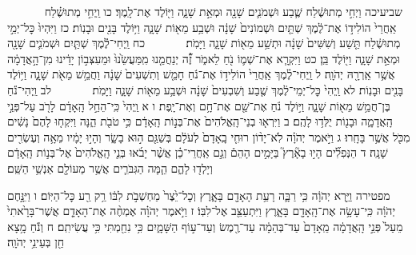 \documentclass[twoside, openany, parskip=half, 11pt]{book}
\begin{document}
　　　 שביעיכה וַיְחִ֣י מְתוּשֶׁ֔לַח שֶׁ֧בַע וּשְׁמֹנִ֛ים שָׁנָ֖ה וּמְאַ֣ת שָׁנָ֑ה וַיּ֖וֹלֶד אֶת־לָֽמֶךְ׃ כו וַֽיְחִ֣י מְתוּשֶׁ֗לַח אַֽחֲרֵי֙ הוֹלִיד֣וֹ אֶת־לֶ֔מֶךְ שְׁתַּ֤יִם וּשְׁמוֹנִים֙ שָׁנָ֔ה וּשְׁבַ֥ע מֵא֖וֹת שָׁנָ֑ה וַיּ֥וֹלֶד בָּנִ֖ים וּבָנֽוֹת׃ כז וַיִּהְיוּ֙ כׇּל־יְמֵ֣י מְתוּשֶׁ֔לַח תֵּ֤שַׁע וְשִׁשִּׁים֙ שָׁנָ֔ה וּתְשַׁ֥ע מֵא֖וֹת שָׁנָ֑ה וַיָּמֹֽת׃
　　　 כח וַֽיְחִי־לֶ֕מֶךְ שְׁתַּ֧יִם וּשְׁמֹנִ֛ים שָׁנָ֖ה וּמְאַ֣ת שָׁנָ֑ה וַיּ֖וֹלֶד בֵּֽן׃ כט וַיִּקְרָ֧א אֶת־שְׁמ֛וֹ נֹ֖חַ לֵאמֹ֑ר זֶ֞‍֠ה יְנַחֲמֵ֤נוּ מִֽמַּעֲשֵׂ֙נוּ֙ וּמֵעִצְּב֣וֹן יָדֵ֔ינוּ מִן־הָ֣אֲדָמָ֔ה אֲשֶׁ֥ר אֵֽרְרָ֖הּ יְהֹוָֽה׃ ל וַֽיְחִי־לֶ֗מֶךְ אַֽחֲרֵי֙ הוֹלִיד֣וֹ אֶת־נֹ֔חַ חָמֵ֤שׁ וְתִשְׁעִים֙ שָׁנָ֔ה וַחֲמֵ֥שׁ מֵאֹ֖ת שָׁנָ֑ה וַיּ֥וֹלֶד בָּנִ֖ים וּבָנֽוֹת׃ לא וַֽיְהִי֙ כׇּל־יְמֵי־לֶ֔מֶךְ שֶׁ֤בַע וְשִׁבְעִים֙ שָׁנָ֔ה וּשְׁבַ֥ע מֵא֖וֹת שָׁנָ֑ה וַיָּמֹֽת׃
　　　 לב וַֽיְהִי־נֹ֕חַ בֶּן־חֲמֵ֥שׁ מֵא֖וֹת שָׁנָ֑ה וַיּ֣וֹלֶד נֹ֔חַ אֶת־שֵׁ֖ם אֶת־חָ֥ם וְאֶת־יָֽפֶת׃ ו א וַֽיְהִי֙ כִּֽי־הֵחֵ֣ל הָֽאָדָ֔ם לָרֹ֖ב עַל־פְּנֵ֣י הָֽאֲדָמָ֑ה וּבָנ֖וֹת יֻלְּד֥וּ לָהֶֽם׃ ב וַיִּרְא֤וּ בְנֵי־הָֽאֱלֹהִים֙ אֶת־בְּנ֣וֹת הָֽאָדָ֔ם כִּ֥י טֹבֹ֖ת הֵ֑נָּה וַיִּקְח֤וּ לָהֶם֙ נָשִׁ֔ים מִכֹּ֖ל אֲשֶׁ֥ר בָּחָֽרוּ׃ ג וַיֹּ֣אמֶר יְהֹוָ֗ה לֹֽא־יָד֨וֹן רוּחִ֤י בָֽאָדָם֙ לְעֹלָ֔ם בְּשַׁגַּ֖ם ה֣וּא בָשָׂ֑ר וְהָי֣וּ יָמָ֔יו מֵאָ֥ה וְעֶשְׂרִ֖ים שָׁנָֽה׃ ד הַנְּפִלִ֞ים הָי֣וּ בָאָ֘רֶץ֮ בַּיָּמִ֣ים הָהֵם֒ וְגַ֣ם אַֽחֲרֵי־כֵ֗ן אֲשֶׁ֨ר יָבֹ֜אוּ בְּנֵ֤י הָֽאֱלֹהִים֙ אֶל־בְּנ֣וֹת הָֽאָדָ֔ם וְיָלְד֖וּ לָהֶ֑ם הֵ֧מָּה הַגִּבֹּרִ֛ים אֲשֶׁ֥ר מֵעוֹלָ֖ם אַנְשֵׁ֥י הַשֵּֽׁם׃

מפטירה וַיַּ֣רְא יְהֹוָ֔ה כִּ֥י רַבָּ֛ה רָעַ֥ת הָאָדָ֖ם בָּאָ֑רֶץ וְכׇל־יֵ֙צֶר֙ מַחְשְׁבֹ֣ת לִבּ֔וֹ רַ֥ק רַ֖ע כׇּל־הַיּֽוֹם׃ ו וַיִּנָּ֣חֶם יְהֹוָ֔ה כִּֽי־עָשָׂ֥ה אֶת־הָֽאָדָ֖ם בָּאָ֑רֶץ וַיִּתְעַצֵּ֖ב אֶל־לִבּֽוֹ׃ ז וַיֹּ֣אמֶר יְהֹוָ֗ה אֶמְחֶ֨ה אֶת־הָאָדָ֤ם אֲשֶׁר־בָּרָ֙אתִי֙ מֵעַל֙ פְּנֵ֣י הָֽאֲדָמָ֔ה מֵֽאָדָם֙ עַד־בְּהֵמָ֔ה עַד־רֶ֖מֶשׂ וְעַד־ע֣וֹף הַשָּׁמָ֑יִם כִּ֥י נִחַ֖מְתִּי כִּ֥י עֲשִׂיתִֽם׃ ח וְנֹ֕חַ מָ֥צָא חֵ֖ן בְּעֵינֵ֥י יְהֹוָֽה׃
\end{document}
